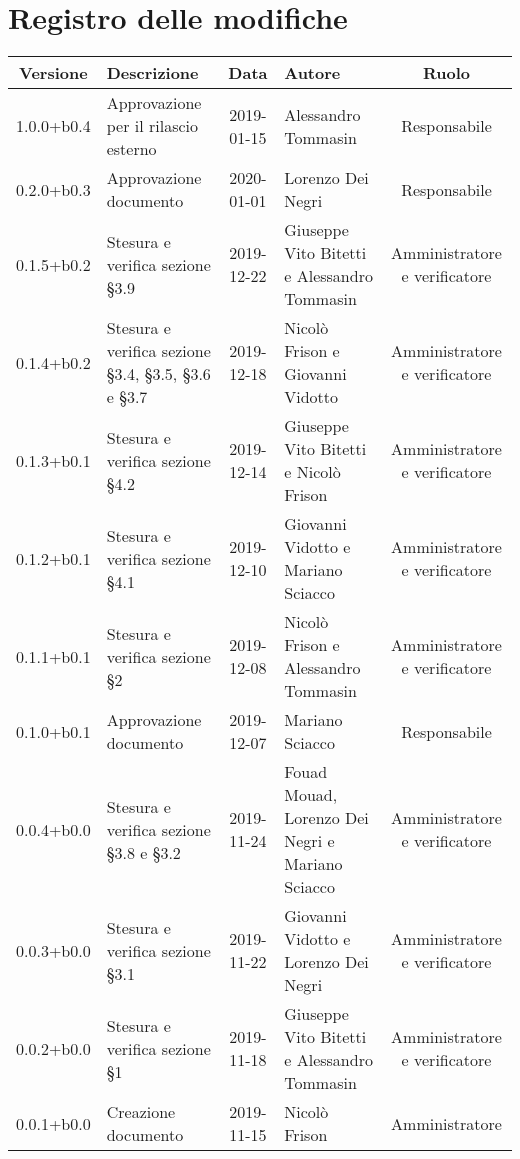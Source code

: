 \section*{Registro delle modifiche}

\begin{center}
	\begin{longtable}{|c|p{3cm}|c|p{4cm}|c|}
	\hline
	\rowcolor{lighter-grayer}
	\textbf{Versione} & \textbf{Descrizione} & \textbf{Data} & \textbf{Autore} & \textbf{Ruolo} \\
	\hline
	\endfirsthead



	\hline
	1.0.0+b0.4 & Approvazione per il rilascio esterno & 2019-01-15 & Alessandro Tommasin & Responsabile \\
	\hline
	0.2.0+b0.3 & Approvazione documento & 2020-01-01 & Lorenzo Dei Negri & Responsabile \\
	\hline
	0.1.5+b0.2 & Stesura e verifica sezione \S3.9 & 2019-12-22 & Giuseppe Vito Bitetti e Alessandro Tommasin  & Amministratore e verificatore \\
	\hline
	0.1.4+b0.2 & Stesura e verifica sezione \S3.4, \S3.5, \S3.6 e \S3.7 & 2019-12-18 & Nicolò Frison e Giovanni Vidotto & Amministratore e verificatore \\
	\hline
	0.1.3+b0.1 & Stesura e verifica sezione \S4.2 & 2019-12-14 & Giuseppe Vito Bitetti e Nicolò Frison & Amministratore e verificatore \\
	\hline
	0.1.2+b0.1 & Stesura e verifica sezione \S4.1 & 2019-12-10 & Giovanni Vidotto e Mariano Sciacco & Amministratore e verificatore \\
	\hline
	0.1.1+b0.1 & Stesura e verifica sezione \S2  & 2019-12-08 & Nicolò Frison e Alessandro Tommasin & Amministratore e verificatore \\
	\hline
	0.1.0+b0.1 & Approvazione documento & 2019-12-07 & Mariano Sciacco & Responsabile \\
	\hline
	0.0.4+b0.0 & Stesura e verifica sezione \S3.8 e \S3.2 & 2019-11-24 & Fouad Mouad, Lorenzo Dei Negri e Mariano Sciacco & Amministratore e verificatore \\
	\hline
	0.0.3+b0.0 & Stesura e verifica sezione \S3.1 & 2019-11-22 & Giovanni Vidotto e Lorenzo Dei Negri & Amministratore e verificatore \\
	\hline
	0.0.2+b0.0 & Stesura e verifica sezione \S1 & 2019-11-18 & Giuseppe Vito Bitetti e Alessandro Tommasin & Amministratore e verificatore \\
	\hline
	0.0.1+b0.0 & Creazione documento & 2019-11-15 & Nicolò Frison & Amministratore  \\
	\hline

	\end{longtable}
\end{center}
